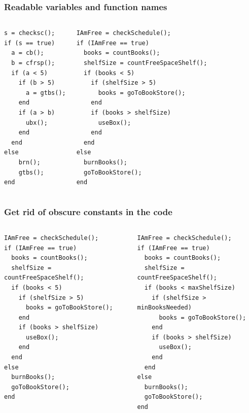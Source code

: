 \documentclass[11pt,table,final,fleqn,xcolor={usenames,dvipsnames},unknownkeysallowed,handout]{beamer}
\begin{document}
\begin{frame}[fragile]
 \frametitle{Readable variables and function names}
 \begin{columns}[T]
\begin{lstlisting}
s = checksc();
if (s == true)
  a = cb();
  b = cfrsp();
  if (a < 5)
    if (b > 5)
      a = gtbs();
    end
    if (a > b)
      ubx();
    end
  end
else
    brn();
    gtbs();
end
 \end{lstlisting}
     \begin{lstlisting}
IAmFree = checkSchedule();
if (IAmFree == true)
  books = countBooks();
  shelfSize = countFreeSpaceShelf();
  if (books < 5)
    if (shelfSize > 5)
      books = goToBookStore();
    end
    if (books > shelfSize)
      useBox();
    end
  end
else
  burnBooks();
  goToBookStore();
end
 \end{lstlisting}
 \end{columns}
\end{frame}

\begin{frame}[fragile]
 \frametitle{Get rid of obscure constants in the code}
 \begin{columns}[T]
     \begin{lstlisting}[basicstyle=\scriptsize\ttfamily]
IAmFree = checkSchedule();
if (IAmFree == true)
  books = countBooks();
  shelfSize = countFreeSpaceShelf();
  if (books < 5)
    if (shelfSize > 5)
      books = goToBookStore();
    end
    if (books > shelfSize)
      useBox();
    end
  end
else
  burnBooks();
  goToBookStore();
end
 \end{lstlisting}
     \begin{lstlisting}[basicstyle=\scriptsize\ttfamily,emph={minBooksNeeded,maxShelfSize},emphstyle=\color{red}]
IAmFree = checkSchedule();
if (IAmFree == true)
  books = countBooks();
  shelfSize = countFreeSpaceShelf();
  if (books < maxShelfSize)
    if (shelfSize > minBooksNeeded)
      books = goToBookStore();
    end
    if (books > shelfSize)
      useBox();
    end
  end
else
  burnBooks();
  goToBookStore();
end
 \end{lstlisting}
 \end{columns}
\end{frame}
\end{document}
